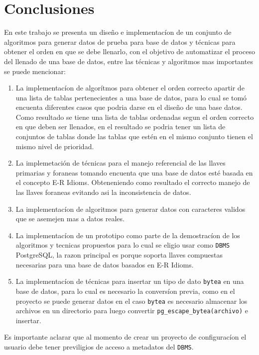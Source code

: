\chapter{Conclusiones}
En este trabajo se presenta un dise\~no e implementac\'ion de un conjunto de algoritmos para generar datos de prueba para base de datos y t\'ecnicas para obtener el orden en que se debe llenarlo, con el objetivo de automatizar el proceso del llenado de una base de datos, entre las t\'ecnicas y algoritmos mas importantes se puede mencionar:

\begin{enumerate}
\item La implementac\'ion de algor\'itmos para obtener el orden correcto apartir de una lista de tablas pertenecientes a una base de datos, para lo cual se tom\'o encuenta diferentes casos que podria darse en el dise\~no de una base datos. Como resultado se tiene una lista de tablas ordenadas segun el orden correcto en que deben ser llenados, en el resultado se podria tener un lista de conjuntos de tablas donde las tablas que est\'en en el mismo conjunto tienen el mismo nivel de prioridad.
\item La implemetaci\'on de t\'ecnicas para el manejo referencial de las llaves primarias y foraneas tomando encuenta que una base de datos est\'e  basada en el concepto E-R Idioms. Obteneniendo como resultado el correcto manejo de las llaves foraneas evitando asi la inconsistencia de datos.
\item La implementac\'ion de algoritmos para generar datos con caracteres validos que se asemejen mas a datos reales.
\item La implementac\'ion de un prototipo como parte de la demostrac\'ion de los algoritmos y tecnicas propuestos para lo cual se eligio usar como \texttt{DBMS} PostgreSQL, la razon principal es porque soporta llaves compuestas necesarias para una base de datos basados en E-R Idioms.  
\item La implementac\'ion de t\'ecnicas para insertar un tipo de dato \texttt{bytea} en una base de datos, para lo cual es necesario la convers\'ion previa, como en el proyecto se puede generar datos en el caso \texttt{bytea} es necesario almacenar los archivos en un directorio para luego convertir \texttt{pg\_escape\_bytea(archivo)} e insertar.
\end{enumerate}

Es importante aclarar que al momento de crear un proyecto de configurac\'ion el usuario debe tener previligios de acceso a metadatos del \texttt{DBMS}.